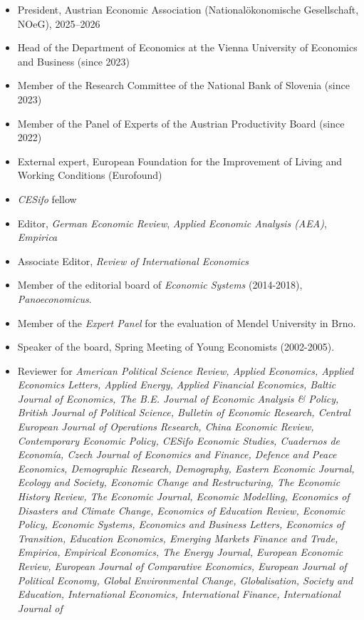\documentclass[10pt]{res} %
\begin{document}
\begin{resume}
\begin{itemize}
\item President, Austrian Economic Association (National\"okonomische Gesellschaft, NOeG), 2025--2026
\item Head of the Department of Economics at the Vienna University of Economics and Business (since 2023)
\item Member of the Research Committee of the National Bank of Slovenia (since 2023)
\item Member of the Panel of Experts of the Austrian Productivity Board (since 2022)
	\item External expert, European Foundation for the Improvement of Living and Working Conditions (Eurofound)
\item \textit{CESifo} fellow
    \item  Editor, {\it German Economic Review}, {\it Applied Economic Analysis (AEA)}, {\it Empirica}
    \item Associate Editor, {\it Review of International Economics}
\item Member of the editorial board of {\it Economic Systems} (2014-2018), {\it Panoeconomicus}.
\item  Member of the \textit{Expert Panel} for the evaluation of Mendel University in Brno.
\item Speaker of the board, Spring Meeting of Young Economists (2002-2005).
\item Reviewer for {\it American Political Science Review, Applied Economics, Applied Economics
Letters, Applied Energy, Applied Financial Economics, Baltic Journal of Economics,
The B.E. Journal of Economic Analysis \& Policy, British Journal of Political Science,
Bulletin of Economic Research, Central European Journal of Operations Research,
China Economic Review, Contemporary Economic Policy, CESifo Economic
Studies, Cuadernos de Econom\'ia, Czech Journal of Economics and Finance, Defence
and Peace Economics, Demographic Research, Demography, Eastern Economic Journal,
Ecology and Society, Economic Change and Restructuring, The Economic History
Review, The Economic Journal, Economic Modelling, Economics of Disasters and Climate Change, Economics of Education Review,
Economic Policy, Economic Systems, Economics and Business Letters, Economics of
Transition, Education Economics, Emerging Markets Finance and Trade, Empirica,
Empirical Economics, The Energy Journal, European Economic Review, European
Journal of Comparative Economics, European Journal of Political Economy, Global
Environmental Change, Globalisation, Society and Education, International Economics, International Finance, International Journal of
}
\end{itemize}
\end{resume}
\end{document}
